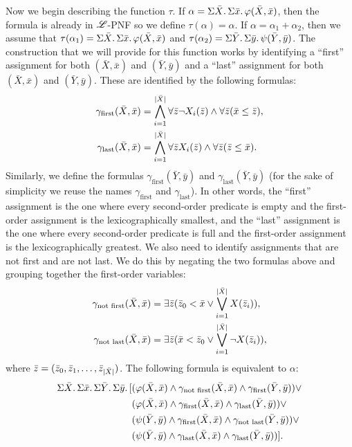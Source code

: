 Now we begin describing the function $\tau$. If $\alpha = \Sigma{\bar{X}}.\,\Sigma{\bar{x}}.\,\varphi(\bar{X},\bar{x})$, then the formula is already in $\mathscr{L}$-PNF so we define $\tau(\alpha) = \alpha$. If $\alpha = \alpha_1 + \alpha_2$, then we assume that $\tau(\alpha_1) = \Sigma{\bar{X}}.\,\Sigma{\bar{x}}.\,\varphi(\bar{X},\bar{x})$ and $\tau(\alpha_2) = \Sigma{\bar{Y}}.\,\Sigma{\bar{y}}.\,\psi(\bar{Y},\bar{y})$. The construction that we will provide for this function works by identifying a ``first'' assignment for both $(\bar{X},\bar{x})$ and $(\bar{Y},\bar{y})$ and a ``last'' assignment for both $(\bar{X},\bar{x})$ and $(\bar{Y},\bar{y})$. These are identified by the following formulas:
\begin{align*}
\gamma_{\text{first}}(\bar{X},\bar{x}) &= \bigwedge_{i = 1}^{\vert \bar{X} \vert} \forall\bar{z}\neg X_i(\bar{z}) \wedge \forall\bar{z}(\bar{x}\leq\bar{z}), \\
\gamma_{\text{last}}(\bar{X},\bar{x}) &= \bigwedge_{i = 1}^{\vert \bar{X} \vert} \forall\bar{z} X_i(\bar{z}) \wedge \forall\bar{z}(\bar{z}\leq\bar{x}).
\end{align*}
Similarly, we define the formulas $\gamma_{\text{first}}(\bar{Y},\bar{y})$ and $\gamma_{\text{last}}(\bar{Y},\bar{y})$ (for the sake of simplicity we reuse the names $\gamma_{\text{first}}$ and $\gamma_{\text{last}}$).
In other words, the ``first'' assignment is the one where every second-order predicate is empty and the first-order assignment is the lexicographically smallest, and the ``last'' assignment is the one where every second-order predicate is full and the first-order assignment is the lexicographically greatest. We also need to identify assignments that are not first and are not last. We do this by negating the two formulas above and grouping together the first-order variables:
\begin{align*}
\gamma_{\text{not first}}(\bar{X},\bar{x}) &= \exists\bar{z}(\bar{z}_0 < \bar{x} \vee \bigvee_{i = 1}^{\vert \bar{X} \vert}X(\bar{z}_i)), \\
\gamma_{\text{not last}}(\bar{X},\bar{x}) &= \exists\bar{z}(\bar{x} < \bar{z}_0 \vee \bigvee_{i = 1}^{\vert \bar{X} \vert}\neg X(\bar{z}_i)),
\end{align*}
where $\bar{z} = (\bar{z}_0,\bar{z}_1,\ldots,\bar{z}_{\vert \bar{X} \vert})$. The following formula is equivalent to $\alpha$:
\begin{align}
\Sigma{\bar{X}}.\,\Sigma{\bar{x}}.\,\Sigma{\bar{Y}}.\,\Sigma{\bar{y}}.\,[&(\varphi(\bar{X},\bar{x})\wedge\gamma_{\text{not first}}(\bar{X},\bar{x})\wedge\gamma_{\text{first}}(\bar{Y},\bar{y}))\vee \label{eq:partition1} \\
&(\varphi(\bar{X},\bar{x})\wedge\gamma_{\text{first}}(\bar{X},\bar{x})\wedge\gamma_{\text{last}}(\bar{Y},\bar{y}))\vee \label{eq:partition2}\\
&(\psi(\bar{Y},\bar{y})\wedge\gamma_{\text{first}}(\bar{X},\bar{x})\wedge\gamma_{\text{not last}}(\bar{Y},\bar{y}))\vee \label{eq:partition3}\\
&(\psi(\bar{Y},\bar{y})\wedge\gamma_{\text{last}}(\bar{X},\bar{x})\wedge\gamma_{\text{last}}(\bar{Y},\bar{y}))]. \label{eq:partition4}
\end{align}
